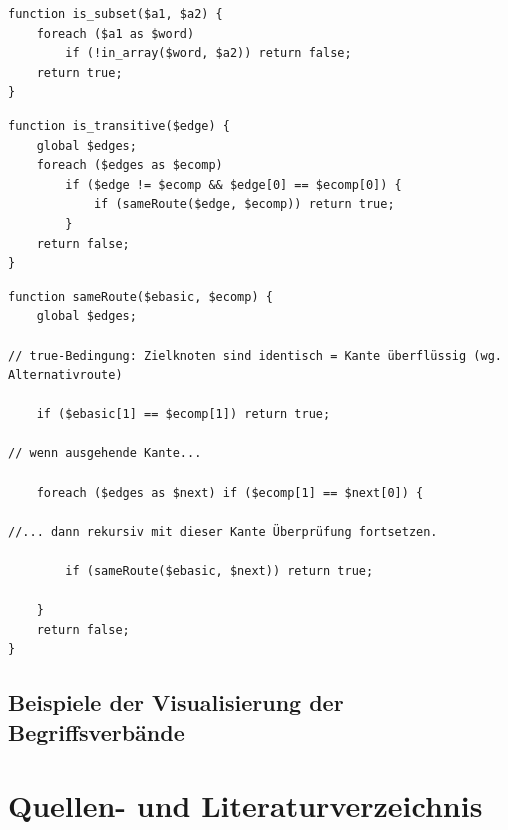 \documentclass[pagesize,paper=A4,DIV=calc,fontsize=12pt,draft=false]{scrreprt}
\begin{document}
\begin{lstlisting}[caption={Überprüfung, ob \texttt{\$a1} Untermenge von \texttt{\$a2} ist}]
function is_subset($a1, $a2) {
    foreach ($a1 as $word) 
        if (!in_array($word, $a2)) return false;
    return true;
}
\end{lstlisting}

\lstset{
language=PHP
}

\begin{lstlisting}[caption={Überprüfung, ob eine Kante überflüssig ist. 
Wenn der Ausgangsknoten beider Kanten gleich ist, wird überprüft, ob ein Alternativpfad existiert.}]
function is_transitive($edge) {
    global $edges;
    foreach ($edges as $ecomp) 
        if ($edge != $ecomp && $edge[0] == $ecomp[0]) { 
            if (sameRoute($edge, $ecomp)) return true;
        }
    return false;
}
\end{lstlisting}

\lstset{
language=PHP
}

\begin{lstlisting}[caption={Überprüfung, ob \texttt{\$ecomp} über andere ausgehende Kanten zum Zielknoten von \texttt{\$ebasic} führt.}]
function sameRoute($ebasic, $ecomp) {
    global $edges;

// true-Bedingung: Zielknoten sind identisch = Kante überflüssig (wg. Alternativroute)

    if ($ebasic[1] == $ecomp[1]) return true;

// wenn ausgehende Kante...

    foreach ($edges as $next) if ($ecomp[1] == $next[0]) {

//... dann rekursiv mit dieser Kante Überprüfung fortsetzen.
		
        if (sameRoute($ebasic, $next)) return true; 

    }
    return false;
}
\end{lstlisting}

\section{Beispiele der Visualisierung der Begriffsverbände}



\chapter{Quellen- und Literaturverzeichnis}
\end{document}
